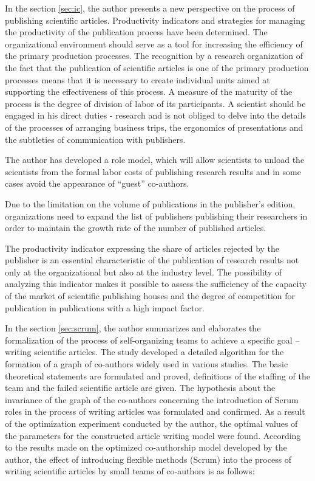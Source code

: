\documentclass[12pt]{report}
\theoremstyle{definition}
\begin{document}
In the section \ref{sec:ic}, the author presents a new perspective on the process of publishing scientific articles. 
Productivity indicators and strategies for managing the productivity of the publication process have been determined.
The organizational environment should serve as a tool for increasing the efficiency of the primary production processes. The recognition by a research organization of the fact that the publication of scientific articles is one of the primary production processes means that it is necessary to create individual units aimed at supporting the effectiveness of this process. A measure of the maturity of the process is the degree of division of labor of its participants. A scientist should be engaged in his direct duties - research and is not obliged to delve into the details of the processes of arranging business trips, the ergonomics of presentations and the subtleties of communication with publishers.

The author has developed a role model, which will allow scientists to unload the scientists from the formal labor costs of publishing research results and in some cases avoid the appearance of ``guest'' co-authors.

Due to the limitation on the volume of publications in the publisher’s edition, organizations need to expand the list of publishers publishing their researchers in order to maintain the growth rate of the number of published articles.

The productivity indicator expressing the share of articles rejected by the publisher is an essential characteristic of the publication of research results not only at the organizational but also at the industry level. The possibility of analyzing this indicator makes it possible to assess the sufficiency of the capacity of the market of scientific publishing houses and the degree of competition for publication in publications with a high impact factor.

In the section \ref{sec:scrum}, the author summarizes and elaborates the formalization of the process of self-organizing teams to achieve a specific goal -- writing scientific articles.
The study developed a detailed algorithm for the formation of a graph of co-authors widely used in various studies.
The basic theoretical statements are formulated and proved, definitions of the staffing of the team and the failed scientific article are given.
The hypothesis about the invariance of the graph of the co-authors concerning the introduction of Scrum roles in the process of writing articles was formulated and confirmed.
As a result of the optimization experiment conducted by the author, the optimal values of the parameters for the constructed article writing model were found.
According to the results made on the optimized co-authorship model developed by the author, the effect of introducing flexible methods (Scrum) into the process of writing scientific articles by small teams of co-authors is as follows:
\end{document}
